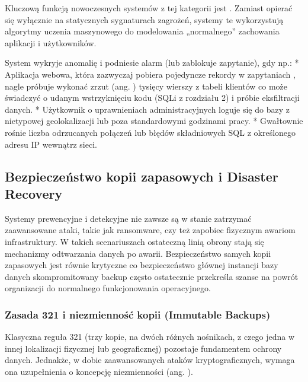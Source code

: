 \documentclass[letterpaper,10pt,polish]{sphinxmanual}
\begin{document}
\sphinxAtStartPar
Kluczową funkcją nowoczesnych systemów z tej kategorii jest . Zamiast opierać się wyłącznie na statycznych sygnaturach zagrożeń, systemy te wykorzystują algorytmy uczenia maszynowego do modelowania „normalnego” zachowania aplikacji i użytkowników.

\sphinxAtStartPar
System wykryje anomalię i podniesie alarm (lub zablokuje zapytanie), gdy np.:
* Aplikacja webowa, która zazwyczaj pobiera pojedyncze rekordy w zapytaniach , nagle próbuje wykonać zrzut (ang. ) tysięcy wierszy z tabeli klientów \textendash{} co może świadczyć o udanym wstrzyknięciu kodu (SQLi z rozdziału 2) i próbie eksfiltracji danych.
* Użytkownik o uprawnieniach administracyjnych loguje się do bazy z nietypowej geolokalizacji lub poza standardowymi godzinami pracy.
* Gwałtownie rośnie liczba odrzucanych połączeń lub błędów składniowych SQL z określonego adresu IP wewnątrz sieci.

\sphinxstepscope


\subsection{Bezpieczeństwo kopii zapasowych i Disaster Recovery}
\label{\detokenize{rozdzia_u0142_2/rozdzia_u0142_27/rozdzial_6:bezpieczenstwo-kopii-zapasowych-i-disaster-recovery}}\label{\detokenize{rozdzia_u0142_2/rozdzia_u0142_27/rozdzial_6::doc}}
\sphinxAtStartPar
Systemy prewencyjne i detekcyjne nie zawsze są w stanie zatrzymać zaawansowane ataki, takie jak ransomware, czy też zapobiec fizycznym awariom infrastruktury. W takich scenariuszach ostateczną linią obrony stają się mechanizmy odtwarzania danych po awarii. Bezpieczeństwo samych kopii zapasowych jest równie krytyczne co bezpieczeństwo głównej instancji bazy danych \textendash{} skompromitowany backup często ostatecznie przekreśla szanse na powrót organizacji do normalnego funkcjonowania operacyjnego.


\subsubsection{Zasada 3\sphinxhyphen{}2\sphinxhyphen{}1 i niezmienność kopii (Immutable Backups)}
\label{\detokenize{rozdzia_u0142_2/rozdzia_u0142_27/rozdzial_6:zasada-3-2-1-i-niezmiennosc-kopii-immutable-backups}}
\sphinxAtStartPar
Klasyczna reguła 3\sphinxhyphen{}2\sphinxhyphen{}1 (trzy kopie, na dwóch różnych nośnikach, z czego jedna w innej lokalizacji fizycznej lub geograficznej) pozostaje fundamentem ochrony danych. Jednakże, w dobie zaawansowanych ataków kryptograficznych, wymaga ona uzupełnienia o koncepcję niezmienności (ang. ).
\end{document}
